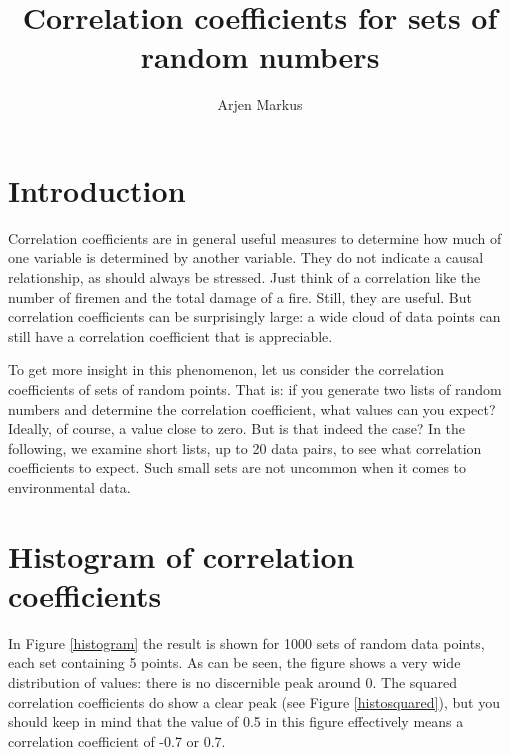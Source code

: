 \documentclass[onecolumn]{article}
\begin{document}
\title{Correlation coefficients for sets of random numbers}

\author{Arjen Markus}

\maketitle

\section*{Introduction}
Correlation coefficients are in general useful measures to determine how much of one variable is determined by
another variable. They do not indicate a causal relationship, as should always be stressed. Just think of
a correlation like the number of firemen and the total damage of a fire. Still, they are useful. But
correlation coefficients can be surprisingly large: a wide cloud of data points can still have a correlation
coefficient that is appreciable.

To get more insight in this phenomenon, let us consider the correlation coefficients of sets of random points.
That is: if you generate two lists of random numbers and determine the correlation coefficient, what values
can you expect? Ideally, of course, a value close to zero. But is that indeed the case? In the following,
we examine short lists, up to 20 data pairs, to see what correlation coefficients to expect. Such small sets
are not uncommon when it comes to environmental data.

\section*{Histogram of correlation coefficients}
In Figure \ref{histogram} the result is shown for 1000 sets of random data points, each set containing 5 points.
As can be seen, the figure shows a very wide distribution of values: there is no discernible peak around 0.
The squared correlation coefficients do show a clear peak (see Figure \ref{histosquared}), but you should
keep in mind that the value of 0.5 in this figure effectively means a correlation coefficient of -0.7 or 0.7.
\end{document}
